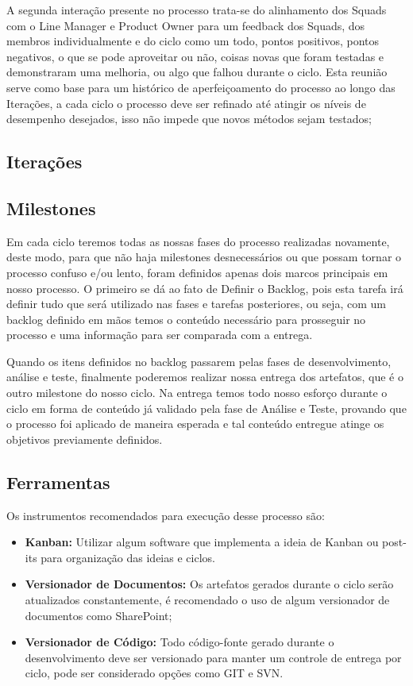 \documentclass[	DIV=calc,%
							paper=a4,%
							fontsize=12pt,%
							onecolumn]{scrartcl}	 					%
\begin{document}
A segunda interação presente no processo trata-se do alinhamento dos Squads com o Line Manager e Product Owner para um feedback dos Squads, dos membros individualmente e do ciclo como um todo, pontos positivos, pontos negativos, o que se pode aproveitar ou não, coisas novas que foram testadas e demonstraram uma melhoria, ou algo que falhou durante o ciclo. Esta reunião serve como base para um histórico de aperfeiçoamento do processo ao longo das Iterações, a cada ciclo o processo deve ser refinado até atingir os níveis de desempenho desejados, isso não impede que novos métodos sejam testados; 
\subsection{Iterações}

\subsection{Milestones}
Em cada ciclo teremos todas as nossas fases do processo realizadas novamente, deste modo, para que não haja milestones desnecessários ou que possam tornar o processo confuso e/ou lento, foram definidos apenas dois marcos principais em nosso processo. O primeiro se dá ao fato de Definir o Backlog, pois esta tarefa irá definir tudo que será utilizado nas fases e tarefas posteriores, ou seja, com um backlog definido em mãos temos o conteúdo necessário para prosseguir no processo e uma informação para ser comparada com a entrega. 

Quando os itens definidos no backlog passarem pelas fases de desenvolvimento, análise e teste, finalmente poderemos realizar nossa entrega dos artefatos, que é o outro milestone do nosso ciclo. Na entrega temos todo nosso esforço durante o ciclo em forma de conteúdo já validado pela fase de Análise e Teste, provando que o processo foi aplicado de maneira esperada e tal conteúdo entregue atinge os objetivos previamente definidos.
\subsection{Ferramentas}
Os instrumentos recomendados para execução desse processo são:
\begin{itemize}
	\item \textbf{Kanban:} Utilizar algum software que implementa a ideia de Kanban ou post-its para organização das ideias e ciclos.
	\item \textbf{Versionador de Documentos:} Os artefatos gerados durante o ciclo serão atualizados constantemente, é recomendado o uso de algum versionador de documentos como SharePoint; 
	\item \textbf{Versionador de Código:} Todo código-fonte gerado durante o desenvolvimento deve ser versionado para manter um controle de entrega por ciclo, pode ser considerado opções como GIT e SVN.
\end{itemize}	
\end{document}
